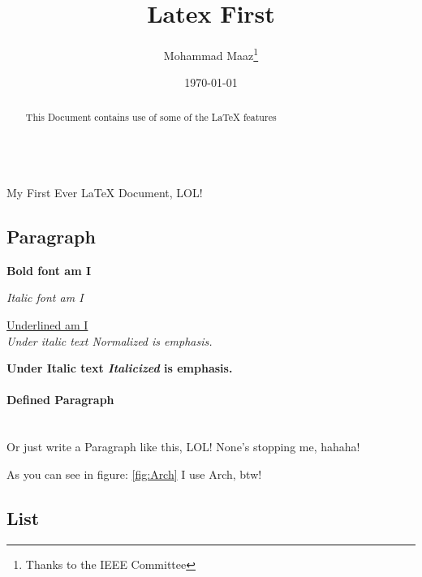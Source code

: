 \documentclass[8pt, letterpaper]{article}
\title{Latex First}
\author{Mohammad Maaz\thanks{Thanks to the IEEE Committee}}
\date{\today}
\begin{document}
\maketitle

\begin{center}
    \item \tableofcontents
\end{center} \leavevmode \\

My First Ever \LaTeX{} Document, LOL!

\begin{abstract}
    This Document contains use of some of the \LaTeX{} features
\end{abstract}

\begin{center}
    \item \section{Paragraph}
\end{center}

\textbf{Bold font am I}

\textit{Italic font am I}

\underline{Underlined am I} \\ %

\textit{Under italic text \emph{Normalized} 
is emphasis.}

\textbf{Under Italic text \emph{Italicized} 
is emphasis.} \\

\paragraph{Defined Paragraph}
\begin{center}
\leavevmode \\
Or just write a Paragraph like this, LOL!
\newline
None's stopping me, hahaha!
\medskip
\end{center}


As you can see in figure: \ref{fig:Arch} I use Arch, btw!


\begin{center}
   \item \section{List}
\end{center}
\end{document}
